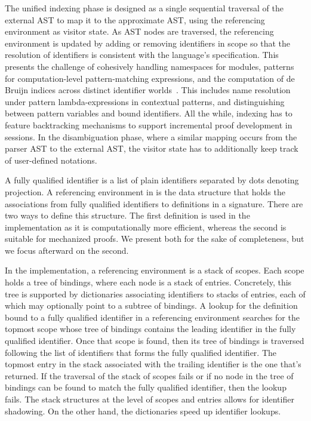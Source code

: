 The unified indexing phase is designed as a single sequential traversal of the external \ac{AST} to map it to the approximate \ac{AST}, using the referencing environment as visitor state.
As \ac{AST} nodes are traversed, the referencing environment is updated by adding or removing identifiers in scope so that the resolution of identifiers is consistent with the language's specification.
This presents the challenge of cohesively handling namespaces for modules, patterns for computation-level pattern-matching expressions, and the computation of de Bruijn indices across distinct identifier worlds~\cite{ferreira2012compiler}.
This includes name resolution under pattern lambda-expressions in contextual \LF patterns, and distinguishing between pattern variables and bound identifiers.
All the while, indexing has to feature backtracking mechanisms to support incremental proof development in \Harpoon sessions.
In the disambiguation phase, where a similar mapping occurs from the parser \ac{AST} to the external \ac{AST}, the visitor state has to additionally keep track of user-defined notations.

A fully qualified identifier is a list of plain identifiers separated by dots denoting projection.
A referencing environment in \Beluga is the data structure that holds the associations from fully qualified identifiers to definitions in a signature.
There are two ways to define this structure.
The first definition is used in the implementation as it is computationally more efficient, whereas the second is suitable for mechanized proofs.
We present both for the sake of completeness, but we focus afterward on the second.

In the implementation, a referencing environment is a stack of scopes.
Each scope holds a tree of bindings, where each node is a stack of entries.
Concretely, this tree is supported by dictionaries associating identifiers to stacks of entries, each of which may optionally point to a subtree of bindings.
A lookup for the definition bound to a fully qualified identifier in a referencing environment searches for the topmost scope whose tree of bindings contains the leading identifier in the fully qualified identifier.
Once that scope is found, then its tree of bindings is traversed following the list of identifiers that forms the fully qualified identifier.
The topmost entry in the stack associated with the trailing identifier is the one that's returned.
If the traversal of the stack of scopes fails or if no node in the tree of bindings can be found to match the fully qualified identifier, then the lookup fails.
The stack structures at the level of scopes and entries allows for identifier shadowing.
On the other hand, the dictionaries speed up identifier lookups.

